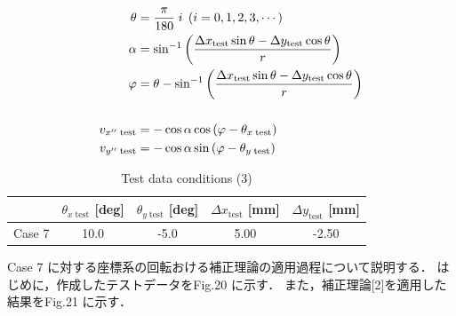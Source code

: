 \begin{align}
  \theta                  & = \frac{\pi}{180} \; i \;\left(i = 0, 1, 2, 3, \cdots\right)                                                       \\
  \alpha                  & = \sin^{-1} \left( \frac{\Delta x_\mathrm{test} \sin \theta - \Delta y_\mathrm{test} \cos \theta}{r} \right)       \\
  \varphi                 & = \theta - \sin^{-1}\left(\frac{\Delta x_\mathrm{test} \sin \theta - \Delta y_\mathrm{test} \cos \theta}{r}\right) \\
  \notag                                                                                                                                       \\
  v_{x'' \;\mathrm{test}} & = - \cos \alpha \cos \left(\varphi - \theta_{x\; \mathrm{test}} \right)                                            \\
  v_{y'' \;\mathrm{test}} & = - \cos \alpha \sin \left(\varphi - \theta_{y\; \mathrm{test}}\right)
\end{align}

\begin{table}[htbp]
  \begin{center}
    \caption{Test data conditions (3)}
    \begin{tabular}{|p{30mm}|p{20mm}|p{20mm}|p{20mm}|p{20mm}|}
      \hline
      \multicolumn{1}{|c|}{}       & \multicolumn{1}{|c|}{$\theta_{x\;\mathrm{test}}$ [deg]} & \multicolumn{1}{|c|}{$\theta_{y\;\mathrm{test}}$ [deg]} & \multicolumn{1}{|c|}{$\Delta x_\mathrm{test}$ [mm]} & \multicolumn{1}{|c|}{$\Delta y_\mathrm{test}$ [mm]} \\ \hline
      \multicolumn{1}{|c|}{Case 7} & \multicolumn{1}{|c|}{10.0}                              & \multicolumn{1}{|c|}{-5.0}                              & \multicolumn{1}{|c|}{5.00}                          & \multicolumn{1}{|c|}{-2.50}                         \\ \hline
    \end{tabular}
  \end{center}
\end{table}

\newpage

Case 7 に対する座標系の回転おける補正理論の適用過程について説明する．
はじめに，作成したテストデータをFig.20 に示す．
また，補正理論[2]を適用した結果をFig.21 に示す．

